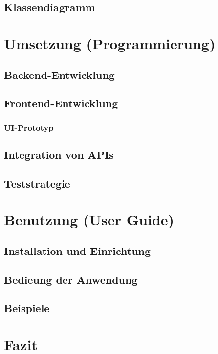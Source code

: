 \documentclass[a4paper]{article}
\begin{document}
\subsection{Klassendiagramm}

\section{Umsetzung (Programmierung)}

\subsection{Backend-Entwicklung}

\subsection{Frontend-Entwicklung}

\subsubsection{UI-Prototyp}

\subsection{Integration von APIs}

\subsection{Teststrategie}

\section{Benutzung (User Guide)}

\subsection{Installation und Einrichtung}

\subsection{Bedieung der Anwendung}

\subsection{Beispiele}

\section{Fazit}
\end{document}
